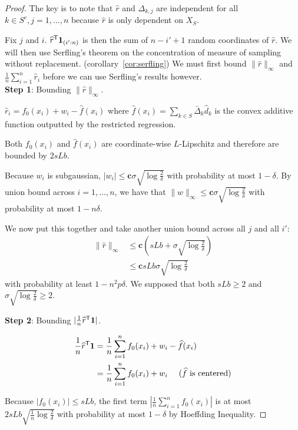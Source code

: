 \begin{proof}
The key is to note that $\hat{r}$ and $\Delta_{k,j}$ are independent for all $k \in S^c,j=1,...,n$ because $\hat{r}$ is only dependent on $X_{S}$.

Fix $j$ and $i$. $\widehat{r}^{\mathsf{T}} \mbox{\boldmath $1$}_{(i':n)}$ is then the sum of $n-i'+1$ random coordinates of $\hat{r}$. We will then use Serfling's theorem on the concentration of measure of sampling without replacement. (corollary~\ref{cor:serfling}) We must first bound $\| \hat{r} \|_\infty$ and $\frac{1}{n} \sum_{i=1}^n \hat{r}_i$ before we can use Serfling's results however.\\

\textbf{Step 1}: Bounding $\| \hat{r} \|_\infty$. 

$\hat{r}_i = f_0(x_i) + w_i - \hat{f}(x_i)$ where $\hat{f}(x_i) = \sum_{k \in S} \bar{\Delta}_k \hat{d}_k$ is the convex additive function outputted by the restricted regression.

Both $f_0(x_i)$ and $\hat{f}(x_i)$ are coordinate-wise $L$-Lipschitz and therefore are bounded by $2 sLb$. 

Because $w_i$ is subgaussian, $|w_i| \leq \mathbf{c} \sigma \sqrt{\log \frac{2}{\delta}}$ with probability at most $1-\delta$. By union bound across $i=1,...,n$, we have that $\| w\|_\infty \leq \mathbf{c} \sigma \sqrt{ \log \frac{2}{\delta}}$ with probability at most $1 - n \delta$.

We now put this together and take another union bound across all $j$ and all $i'$:
\begin{align*}
\| \hat{r} \|_\infty &\leq \mathbf{c} (sLb + \sigma \sqrt{ \log \frac{2}{\delta}}) \\
      &\leq \mathbf{c} sLb \sigma \sqrt{\log \frac{2}{\delta}}
\end{align*}
with probability at least $1 - n^2 p \delta$. We supposed that both $sLb \geq 2$ and $\sigma\sqrt{\log \frac{2}{\delta}} \geq 2$.

\textbf{Step 2}: Bounding $| \frac{1}{n} \widehat{r}^{\mathsf{T}} \mbox{\boldmath $1$} |$. 

\begin{align*}
\frac{1}{n} \widehat{r}^{\mathsf{T}} \mbox{\boldmath $1$} &= 
    \frac{1}{n} \sum_{i=1}^n f_0(x_i) + w_i - \widehat{f}(x_i) \\
  &= \frac{1}{n} \sum_{i=1}^n f_0(x_i) + w_i \quad \textrm{ ($\widehat{f}$ is centered)}
\end{align*}

Because $|f_0(x_i)| \leq sLb$, the first term $| \frac{1}{n} \sum_{i=1}^n f_0(x_i)|$ is at most $2 sLb \sqrt{\frac{1}{n} \log \frac{2}{\delta}}$ with probability at most $1-\delta$ by Hoeffding Inequality.


\end{proof}
